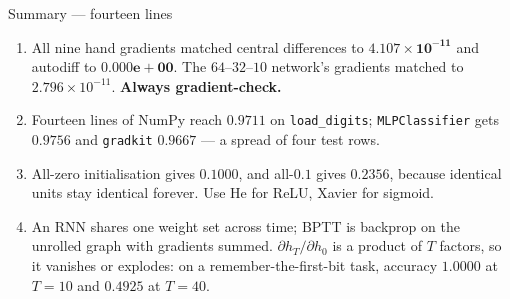 \documentclass[aspectratio=169]{beamer}
\begin{document}
\begin{frame}[shrink=24]{Summary --- fourteen lines}
\begin{enumerate}
      and $\nabla W^{(\ell)} = a^{(\ell-1)}\delta^{(\ell)\top}$.
      For softmax with cross-entropy, $\partial L/\partial z = p - y$.
    \item All nine hand gradients matched central differences to
      $\mathbf{4.107\times10^{-11}}$ and autodiff to $\mathbf{0.000e{+}00}$.
      The $64$--$32$--$10$ network's gradients matched to
      $2.796\times10^{-11}$. \textbf{Always gradient-check.}
    \item Fourteen lines of NumPy reach $\mathbf{0.9711}$ on
      \texttt{load\_digits}; \texttt{MLPClassifier} gets $0.9756$ and
      \texttt{gradkit} $0.9667$ --- a spread of four test rows.
    \item All-zero initialisation gives $\mathbf{0.1000}$, and all-$0.1$
      gives $0.2356$, because identical units stay identical forever. Use He
      for ReLU, Xavier for sigmoid.
    \item An RNN shares one weight set across time; BPTT is backprop on the
      unrolled graph with gradients summed. $\partial h_T/\partial h_0$ is a
      product of $T$ factors, so it vanishes or explodes: on a
      remember-the-first-bit task, accuracy $1.0000$ at $T=10$ and
      $\mathbf{0.4925}$ at $T=40$.
  \end{enumerate}
\end{frame}
\end{document}
